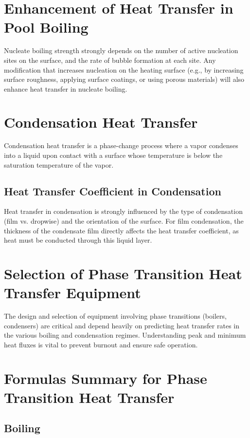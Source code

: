 \section{Enhancement of Heat Transfer in Pool Boiling}
Nucleate boiling strength strongly depends on the number of active nucleation sites on the surface, and the rate of bubble formation at each site. Any modification that increases nucleation on the heating surface (e.g., by increasing surface roughness, applying surface coatings, or using porous materials) will also enhance heat transfer in nucleate boiling.

\section{Condensation Heat Transfer}
Condensation heat transfer is a phase-change process where a vapor condenses into a liquid upon contact with a surface whose temperature is below the saturation temperature of the vapor.

\subsection{Heat Transfer Coefficient in Condensation}
Heat transfer in condensation is strongly influenced by the type of condensation (film vs. dropwise) and the orientation of the surface. For film condensation, the thickness of the condensate film directly affects the heat transfer coefficient, as heat must be conducted through this liquid layer.

\section{Selection of Phase Transition Heat Transfer Equipment}
The design and selection of equipment involving phase transitions (boilers, condensers) are critical and depend heavily on predicting heat transfer rates in the various boiling and condensation regimes. Understanding peak and minimum heat fluxes is vital to prevent burnout and ensure safe operation.

\section{Formulas Summary for Phase Transition Heat Transfer}

\subsection{Boiling}
